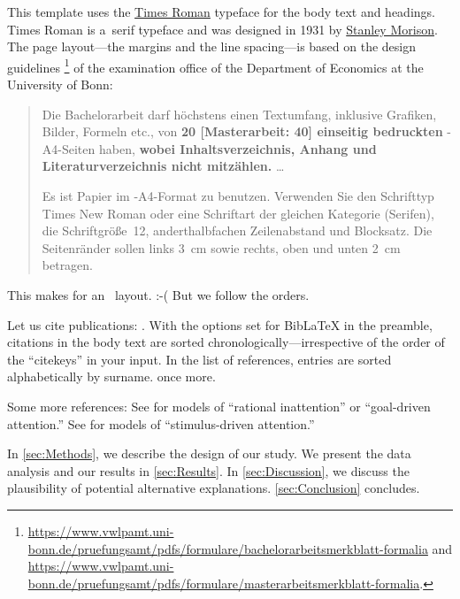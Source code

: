 This template uses the \href{https://en.wikipedia.org/wiki/Times_New_Roman}{Times Roman} typeface for the body text and headings.%
Times Roman is a~serif type\-face and was designed in 1931 by \href{https://en.wikipedia.org/wiki/Stanley_Morison}{Stanley Morison}. The page layout---the margins and the line spacing---is based on the design guidelines%
\footnote{\url{https://www.vwlpamt.uni-bonn.de/pruefungsamt/pdfs/formulare/bachelorarbeitsmerkblatt-formalia} and \url{https://www.vwlpamt.uni-bonn.de/pruefungsamt/pdfs/formulare/masterarbeitsmerkblatt-formalia}.}
of the examination office of the Department of Economics at the University of Bonn:
\begin{quotation}
	Die Bachelorarbeit darf höchstens einen Textumfang, inklusive Grafiken, Bilder, Formeln etc., von \textbf{20 [Masterarbeit: 40] einseitig bedruckten} -A4-Seiten haben, \textbf{wobei Inhalts\-verzeichnis, Anhang und Literaturverzeichnis nicht mitzählen.} \dots

	Es ist Papier im -A4-Format zu benutzen. Verwenden Sie den Schrifttyp \mbox{Times} New Roman oder eine Schriftart der gleichen Kategorie (Serifen), die Schriftgröße~12, anderthalbfachen Zeilenabstand und Blocksatz. Die Seitenränder sollen links 3~cm sowie rechts, oben und unten 2~cm betragen.
\end{quotation}

This makes for an~ layout. :-( But we follow the orders. \blindtext

Let us cite  publications: \cite{Andersen2008, Andreoni2012, Balakrishnan2016, Lisi1995}.%
With the options set for BibLaTeX in the preamble, citations in the body text are  sorted chronologically---irrespective of the order of the ``citekeys'' in your input. In the list of references, entries are sorted alphabetically by surname. \cite{Andersen2008} once more.

\Blindtext[2]

Some more references: See \cite{Sims2003, Gabaix2014} for models of ``rational inattention'' or ``goal-driven attention.'' See \cite{Bordalo2012, Bordalo2013, Koszegi2013, Taubinsky2014, Bushong2016} for models of ``stimulus-driven attention.''

\blindmathtrue

\blindtext

In \autoref{sec:Methods}, we describe the design of our study. We present the data analysis and our results in \autoref{sec:Results}. In \autoref{sec:Discussion}, we discuss the plausibility of potential alternative explanations. \autoref{sec:Conclusion} concludes.
